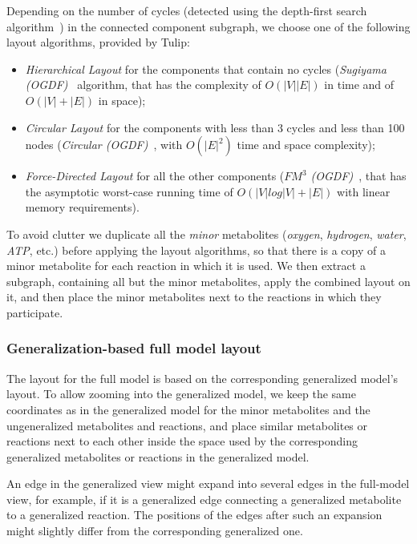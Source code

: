 \documentclass{bmcart}
\begin{document}
Depending on the number of cycles (detected using the depth-first search algorithm~\cite{Cormen2001}) in the connected component subgraph, we choose one of the following layout algorithms, provided by Tulip:
\begin{itemize}
\item \emph{Hierarchical Layout} for the components that contain no cycles (\emph{Sugiyama (OGDF)}~\cite{Sugiyama1981} algorithm, that has the complexity of $O(|V||E|)$ in time and of $O(|V| + |E|)$ in space);
\item \emph{Circular Layout} for the components with less than 3 cycles and less than 100 nodes (\emph{Circular (OGDF)}~\cite{Tamassia:2007:HGD:1202383}, with $O(|E|^2)$ time and space complexity);
\item \emph{Force-Directed Layout} for all the other components (\emph{$FM^3$ (OGDF)}~\cite{Hachul2005}, that has the asymptotic worst-case running time of $O(|V|log|V|+|E|)$ with linear memory requirements).
\end{itemize}

To avoid clutter we duplicate all the \emph{minor} metabolites (\textit{oxygen}, \textit{hydrogen}, \textit{water}, \textit{ATP}, etc.) before applying the layout algorithms, so that there is a copy of a minor metabolite for each reaction in which it is used. We then extract a subgraph, containing all but the minor metabolites, apply the combined layout on it, and then place the minor metabolites next to the reactions in which they participate. 

\subsubsection*{Generalization-based full model layout}
The layout for the full model is based on the corresponding generalized model's layout. To allow zooming into the generalized model, we keep the same coordinates as in the generalized model for the minor metabolites and the ungeneralized metabolites and reactions, and place similar metabolites or reactions next to each other inside the space used by the corresponding generalized metabolites or reactions in the generalized model. 

An edge in the generalized view might expand into several edges in the full-model view, for example, if it is a generalized edge connecting a generalized metabolite to a generalized reaction. The positions of the edges after such an expansion might slightly differ from the corresponding generalized one.
\end{document}
